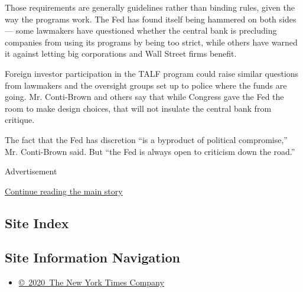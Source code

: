 Those requirements are generally guidelines rather than binding rules,
given the way the programs work. The Fed has found itself being hammered
on both sides --- some lawmakers have questioned whether the central
bank is precluding companies from using its programs by being too
strict, while others have warned it against letting big corporations and
Wall Street firms benefit.

Foreign investor participation in the TALF program could raise similar
questions from lawmakers and the oversight groups set up to police where
the funds are going. Mr. Conti-Brown and others say that while Congress
gave the Fed the room to make design choices, that will not insulate the
central bank from critique.

The fact that the Fed has discretion ``is a byproduct of political
compromise,'' Mr. Conti-Brown said. But ``the Fed is always open to
criticism down the road.''

Advertisement

\protect\hyperlink{after-bottom}{Continue reading the main story}

\hypertarget{site-index}{%
\subsection{Site Index}\label{site-index}}

\hypertarget{site-information-navigation}{%
\subsection{Site Information
Navigation}\label{site-information-navigation}}

\begin{itemize}
\tightlist
\item
  \href{https://help.nytimes.com/hc/en-us/articles/115014792127-Copyright-notice}{©~2020~The
  New York Times Company}
\end{itemize}

